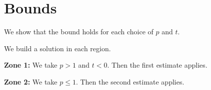 \documentclass{article}
\begin{document}
\section{Bounds}
We show that the bound holds for each choice of $p$ and $t$.

 We build a solution in each region.

\textbf{Zone 1:} We take $p>1$ and $t<0$. Then the first estimate applies.

\textbf{Zone 2:} We take $p\le 1$. Then the second estimate applies.
\end{document}

